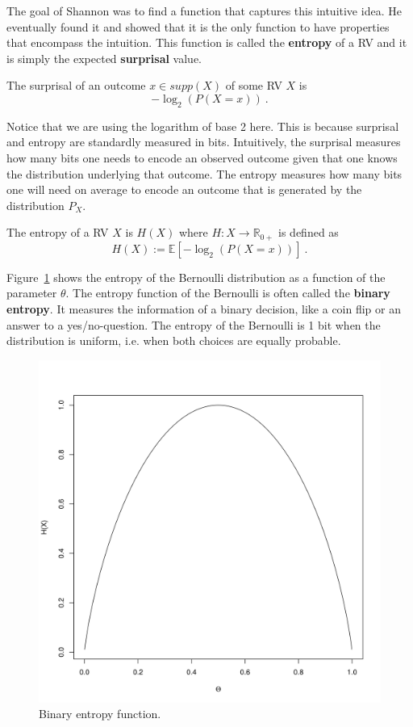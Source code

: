 The goal of Shannon was to find a function that captures this intuitive idea. He eventually found it and showed that it is the only function to have properties
that encompass the intuition. This function is called the \textbf{entropy} of a RV and it is simply the expected \textbf{surprisal} value.

\begin{Definition}[Surprisal]
The surprisal of an outcome $ x \in supp(X) $ of some RV $ X $ is
$$ -\log_{2}(P(X=x)) \ . $$
\end{Definition} 

Notice that we are using the logarithm of base 2 here. This is because surprisal and entropy are standardly measured in bits. Intuitively, the surprisal measures
how many bits one needs to encode an observed outcome given that one knows the distribution underlying that outcome. The entropy measures how many bits one
will need on average to encode an outcome that is generated by the distribution $ P_{X} $.

\begin{Definition}[Entropy]
The entropy of a RV $ X $ is $ H(X) $ where $ H : X \rightarrow \mathbb{R}_{0+} $ is defined as
$$ H(X) := \mathbb{E}[-\log_{2}(P(X=x))] \ . $$
\end{Definition}

Figure~\ref{fig:binaryEntropy} shows the entropy of the Bernoulli distribution as a function of the
parameter $ \theta $. The entropy function of the Bernoulli is often called the \textbf{binary entropy}.
It measures the information of a binary decision, like a coin flip or an answer to a yes/no-question.
The entropy of the Bernoulli is 1 bit when the distribution is uniform, i.e. when both choices are equally 
probable. 

\begin{figure}
\center
\includegraphics[scale=0.4]{binaryEntropy.png}
\caption{Binary entropy function.}
\label{fig:binaryEntropy}
\end{figure}

